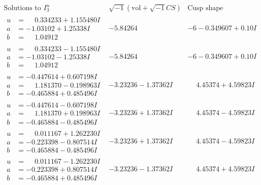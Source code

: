 \documentclass[1p]{elsarticle_modified}
\theoremstyle{definition}
\newcommand{\I}{\sqrt{-1}}
\begin{document}
$$\begin{array}{c|c|c}  
\text{Solutions to }I^u_{3}& \I (\text{vol} + \sqrt{-1}CS) & \text{Cusp shape}\\
 \hline 
\begin{aligned}
u &= \phantom{-}0.334233 + 1.155480 I \\
a &= -1.03102 + 1.25338 I \\
b &= \phantom{-}1.04912\phantom{ +0.000000I}\end{aligned}
 & -5.84264\phantom{ +0.000000I} &                  -6
-0.349607 + 0. 10   I\phantom{ +0.000000I} \\ \hline\begin{aligned}
u &= \phantom{-}0.334233 - 1.155480 I \\
a &= -1.03102 - 1.25338 I \\
b &= \phantom{-}1.04912\phantom{ +0.000000I}\end{aligned}
 & -5.84264\phantom{ +0.000000I} &                  -6
-0.349607 + 0. 10   I\phantom{ +0.000000I} \\ \hline\begin{aligned}
u &= -0.447614 + 0.607198 I \\
a &= \phantom{-}1.181370 - 0.198963 I \\
b &= -0.465884 + 0.485496 I\end{aligned}
 & -3.23236 - 1.37362 I & \phantom{-}4.45374 + 4.59823 I \\ \hline\begin{aligned}
u &= -0.447614 - 0.607198 I \\
a &= \phantom{-}1.181370 + 0.198963 I \\
b &= -0.465884 - 0.485496 I\end{aligned}
 & -3.23236 + 1.37362 I & \phantom{-}4.45374 - 4.59823 I \\ \hline\begin{aligned}
u &= \phantom{-}0.011167 + 1.262230 I \\
a &= -0.223398 - 0.807514 I \\
b &= -0.465884 - 0.485496 I\end{aligned}
 & -3.23236 + 1.37362 I & \phantom{-}4.45374 - 4.59823 I \\ \hline\begin{aligned}
u &= \phantom{-}0.011167 - 1.262230 I \\
a &= -0.223398 + 0.807514 I \\
b &= -0.465884 + 0.485496 I\end{aligned}
 & -3.23236 - 1.37362 I & \phantom{-}4.45374 + 4.59823 I \\ \hline\begin{aligned}

\end{aligned}
\end{array}$$
\end{document}

